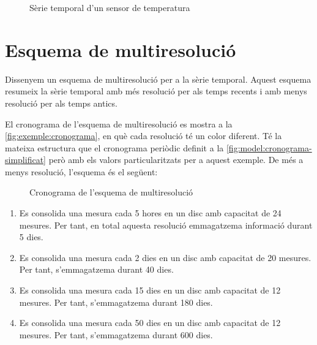 \begin{figure}[tp]
  \centering
  
  \caption{Sèrie temporal d'un sensor de temperatura}
  \label{fig:exemple:original}
\end{figure}





\section{Esquema de multiresolució}

Dissenyem un esquema de multiresolució per a la sèrie temporal.
Aquest esquema resumeix la sèrie temporal amb més resolució per als
temps recents i amb menys resolució per als temps antics.



El cronograma de l'esquema de multiresolució es mostra a la
\autoref{fig:exemple:cronograma}, en què cada resolució té un color
diferent. Té la mateixa estructura que el cronograma periòdic definit
a la \autoref{fig:model:cronograma-simplificat} però amb els valors
particularitzats per a aquest exemple.  De més a menys resolució,
l'esquema és el següent:



\begin{figure}[tp]
  \centering
  
  \caption{Cronograma de l'esquema de multiresolució}
  \label{fig:exemple:cronograma}
\end{figure}

\begin{enumerate}
\item Es consolida una mesura cada 5 hores en un disc amb capacitat de
  24 mesures. Per tant, en total aquesta resolució emmagatzema
  informació durant 5 dies.

\item Es consolida una mesura cada 2 dies en un disc amb capacitat de
  20 mesures. Per tant, s'emmagatzema durant 40 dies.

\item Es consolida una mesura cada 15 dies en un disc amb capacitat de
  12 mesures.  Per tant, s'emmagatzema durant 180 dies.

\item Es consolida una mesura cada 50 dies en un disc amb capacitat de
  12 mesures.  Per tant, s'emmagatzema durant 600 dies.

\end{enumerate}



